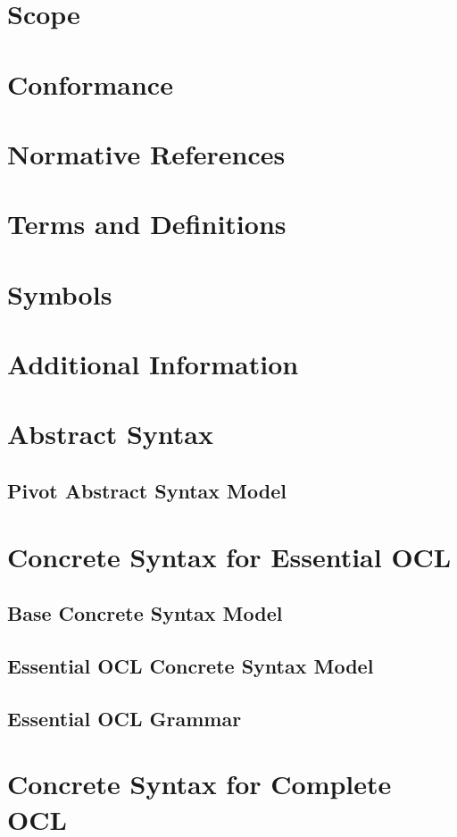\documentclass{scrreprt}   %
\begin{document}
\chapter{Scope}
\chapter{Conformance}
\chapter{Normative References}
\chapter{Terms and Definitions}
\chapter{Symbols}
\chapter{Additional Information}

\chapter{Abstract Syntax}
\section{Pivot Abstract Syntax Model}


\chapter{Concrete Syntax for Essential OCL}
\section{Base Concrete Syntax Model}

\section{Essential OCL Concrete Syntax Model}

\section{Essential OCL Grammar}


\chapter{Concrete Syntax for Complete OCL}
\end{document}
